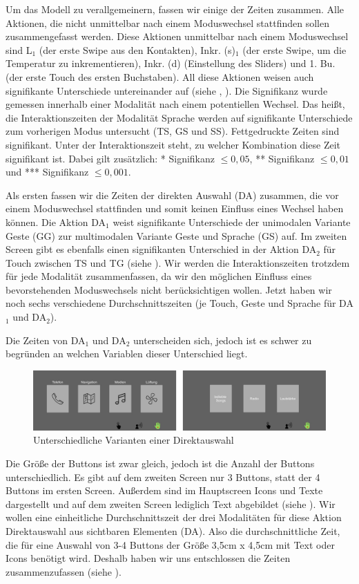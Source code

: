 Um das Modell zu verallgemeinern, fassen wir einige der Zeiten zusammen. 
Alle Aktionen, die nicht unmittelbar nach einem Moduswechsel stattfinden sollen zusammengefasst werden. 
Diese Aktionen unmittelbar nach einem Moduswechsel sind L$_1$ (der erste Swipe aus den Kontakten), Inkr. (s)$_1$ (der erste Swipe, um die Temperatur zu inkrementieren), Inkr. (d) (Einstellung des Sliders) und 1. Bu. (der erste Touch des ersten Buchstaben). 
All diese Aktionen weisen auch signifikante Unterschiede untereinander auf (siehe , ). 
Die Signifikanz wurde gemessen innerhalb einer Modalität nach einem potentiellen Wechsel. 
Das heißt, die Interaktionszeiten der Modalität Sprache werden auf signifikante Unterschiede zum vorherigen Modus untersucht (TS, GS und SS).
Fettgedruckte Zeiten sind signifikant. Unter der Interaktionszeit steht, zu welcher Kombination diese Zeit signifikant ist. 
Dabei gilt zusätzlich: * Signifikanz $\leq 0,05$, ** Signifikanz $\leq 0,01$ und *** Signifikanz $\leq 0,001$. 

Als ersten fassen wir die Zeiten der direkten Auswahl (DA) zusammen, die vor einem Moduswechsel stattfinden und somit keinen Einfluss eines Wechsel haben können. 
Die Aktion DA$_1$ weist signifikante Unterschiede der unimodalen Variante Geste (GG) zur multimodalen Variante Geste und Sprache (GS) auf. 
Im zweiten Screen gibt es ebenfalls einen signifikanten Unterschied in der Aktion DA$_2$ für Touch zwischen TS und TG (siehe ). 
Wir werden die Interaktionszeiten trotzdem für jede Modalität zusammenfassen, da wir den möglichen Einfluss eines bevorstehenden Moduswechsels nicht berücksichtigen wollen.
Jetzt haben wir noch sechs verschiedene Durchschnittszeiten (je Touch, Geste und Sprache für DA$_1$ und DA$_2$).

Die Zeiten von DA$_1$ und DA$_2$ unterscheiden sich, jedoch ist es schwer zu begründen an welchen Variablen dieser Unterschied liegt. 
\begin{figure}
	\centering
		\includegraphics[width=1\textwidth]{img/Screen1vsScreen2.JPG}
	\caption{Unterschiedliche Varianten einer Direktauswahl}
	\label{fig:Screen1vsScreen2}
\end{figure}
Die Größe der Buttons ist zwar gleich, jedoch ist die Anzahl der Buttons unterschiedlich. 
Es gibt auf dem zweiten Screen nur 3 Buttons, statt der 4 Buttons im ersten Screen. 
Außerdem sind im Hauptscreen Icons und Texte dargestellt und auf dem zweiten Screen lediglich Text abgebildet (siehe ). 
Wir wollen eine einheitliche Durchschnittszeit der drei Modalitäten für diese Aktion Direktauswahl aus sichtbaren Elementen (DA). 
Also die durchschnittliche Zeit, die für eine Auswahl von 3-4 Buttons der Größe 3,5cm x 4,5cm mit Text oder Icons benötigt wird. 
Deshalb haben wir uns entschlossen die Zeiten zusammenzufassen (siehe ).

